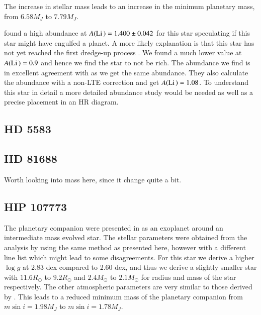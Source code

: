 \documentclass{aa}
\begin{document}
The increase in stellar mass leads to an increase in the minimum planetary mass,
from $6.58M_J$ to $7.79M_J$.

\citet{Nowak2013} found a high  abundance at
$A(\ion{Li}{})=1.400\pm0.042$ for this star speculating if this star might have
engulfed a planet. A more likely explanation is that this star has not yet
reached the first dredge-up process \citep{Nowak2013}. We found a much lower
value at $A(\ion{Li}{})=0.9$ and hence we find the star to not be 
rich. The  abundance we find is in excellent agreement with
\citet{Adamow2014} as we get the same abundance. They also calculate the
 abundance with a non-LTE correction and get $A(\ion{Li}{})=1.08$. To
understand this star in detail a more detailed abundance study would be needed
as well as a precise placement in an HR diagram.

\subsection{HD 5583}
\label{sub:HD_5583}




\subsection{HD 81688}
\label{sub:HD81688}
Worth looking into mass here, since it change quite a bit.






\subsection{HIP 107773}
\label{sub:HIP_107773}
The planetary companion were presented in \citet{Jones2015} as an exoplanet
around an intermediate mass evolved star. The stellar parameters were obtained
from the analysis by \citet{Jones2011} using the same method as presented here,
however with a different line list which might lead to some disagreements. For
this star we derive a higher $\log g$ at 2.83 dex compared to 2.60 dex, and thus
we derive a slightly smaller star with $11.6R_\odot$ to $9.2R_\odot$ and
$2.4M_\odot$ to $2.1M_\odot$ for radius and mass of the star respectively. The
other atmospheric parameters are very similar to those derived by
\citet{Jones2011}. This leads to a reduced minimum mass of the planetary
companion from $m\sin i=1.98M_J$ to $m\sin i=1.78M_J$.
\end{document}
